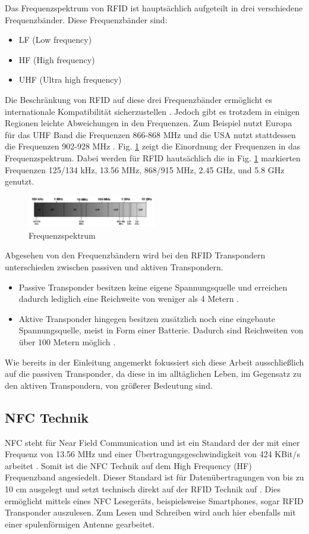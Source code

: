 \documentclass[conference]{IEEEtran}
\begin{document}
Das Frequenzspektrum von RFID ist hauptsächlich aufgeteilt in drei verschiedene Frequenzbänder. Diese Frequenzbänder sind:
\begin{itemize}
\item LF (Low frequency)
\item HF (High frequency)
\item UHF (Ultra high frequency)
\end{itemize}
Die Beschränkung von RFID auf diese drei Frequenzbänder ermöglicht es internationale Kompatibilität sicherzustellen \cite{b9}. Jedoch gibt es trotzdem in einigen Regionen leichte Abweichungen in den Frequenzen. Zum Beispiel nutzt Europa für das UHF Band die Frequenzen 866-868 MHz und die USA nutzt stattdessen die Frequenzen 902-928 MHz \cite{b9}. Fig. \ref{fig1.2} zeigt die Einordnung der Frequenzen in das Frequenzspektrum. Dabei werden für RFID hautsächlich die in Fig. \ref{fig1.2} markierten Frequenzen 125/134 kHz, 13.56 MHz, 868/915 MHz, 2.45 GHz, und 5.8 GHz genutzt. 

\begin{figure}[htbp]
\centerline{\includegraphics[width=0.5\textwidth]{img/frequenzen.png}}
\caption{Frequenzspektrum \cite{b9}}
\label{fig1.2}
\end{figure}

Abgesehen von den Frequenzbändern wird bei den RFID Transpondern unterschieden zwischen passiven und aktiven Transpondern.
\begin{itemize}
\item Passive Transponder besitzen keine eigene Spannungsquelle und erreichen dadurch lediglich eine Reichweite von weniger als 4 Metern \cite{b1}.
\item Aktive Transponder hingegen besitzen zusätzlich noch eine eingebaute Spannungsquelle, meist in Form einer Batterie. Dadurch sind Reichweiten von über 100 Metern möglich \cite{b1}.
\end{itemize}
Wie bereits in der Einleitung angemerkt fokussiert sich diese Arbeit ausschließlich auf die passiven Transponder, da diese in im alltäglichen Leben, im Gegensatz zu den aktiven Transpondern, von größerer Bedeutung sind.

\subsection{NFC Technik}
NFC steht für Near Field Communication und ist ein Standard der der mit einer Frequenz von 13.56 MHz und einer Übertragungsgeschwindigkeit von 424 KBit/s arbeitet \cite{b2}. Somit ist die NFC Technik auf dem High Frequency (HF) Frequenzband angesiedelt. Dieser Standard ist für Datenübertragungen von bis zu 10 cm ausgelegt und setzt technisch direkt auf der RFID Technik auf \cite{b2}. Dies ermöglicht mittels eines NFC Lesegeräts, beispielsweise Smartphones, sogar RFID Transponder auszulesen. Zum Lesen und Schreiben wird auch hier ebenfalls mit einer spulenförmigen Antenne gearbeitet.
\end{document}
